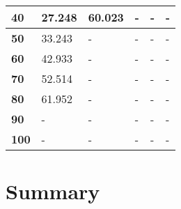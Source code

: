 \begin{table}[H]
\begin{tabular}{|l|l|l|l|l|l|}
\textbf{40}                               & 27.248          & 60.023           & -                & -                & -                \\ \hline
\textbf{50}                               & 33.243          & -                & -                & -                & -                \\ \hline
\textbf{60}                               & 42.933          & -                & -                & -                & -                \\ \hline
\textbf{70}                               & 52.514          & -                & -                & -                & -                \\ \hline
\textbf{80}                               & 61.952          & -                & -                & -                & -                \\ \hline
\textbf{90}                               & -               & -                & -                & -                & -                \\ \hline
\textbf{100}                              & -               & -                & -                & -                & -                \\ \hline
\end{tabular}
\end{table}






















\section{Summary}
\label{sec:SummaryEvaluation}


